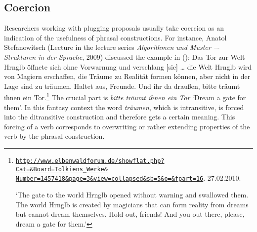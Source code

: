 \subsection{Coercion}
\label{coercion-sec}

Researchers working with plugging proposals usually take coercion as an indication of the usefulness of phrasal
constructions. For instance, Anatol Stefanowitsch (Lecture in the lecture series \emph{Algorithmen und Muster –-
  Strukturen in der Sprache}, 2009) discussed the example in ():
\ea
Das Tor zur Welt Hrnglb öffnete sich ohne Vorwarnung
und verschlang [sie] \ldots{} die Welt Hrnglb wird von Magiern
erschaffen, die Träume zu Realität formen können, aber
nicht in der Lage sind zu träumen. Haltet aus, Freunde.
Und ihr da draußen, bitte träumt ihnen ein Tor.\footnote{
\href{http://www.elbenwaldforum.de/showflat.php?Cat=&Board=Tolkiens_Werke&Number=1457418&page=3&view=collapsed&sb=5&o=&fpart=16}{\nolinkurl{http://www.elbenwaldforum.de/showflat.php?Cat=&Board=Tolkiens_Werke&}}
\href{http://www.elbenwaldforum.de/showflat.php?Cat=&Board=Tolkiens_Werke&Number=1457418&page=3&view=collapsed&sb=5&o=&fpart=16}{\nolinkurl{Number=1457418&page=3&view=collapsed&sb=5&o=&fpart=16}}. 27.02.2010.

`The gate to the world Hrnglb opened without warning and swallowed them. The world Hrnglb is created
by magicians that can form reality from dreams but cannot dream themselves. Hold out, friends! And
you out there, please, dream a gate for them.'
}
\z
The crucial part is \emph{bitte träumt ihnen ein Tor} `Dream a gate for them'. In this fantasy
context the word \emph{träumen}, which is intransitive, is forced into the ditransitive construction
and therefore gets a certain meaning. This forcing of a verb corresponds to overwriting or rather extending properties
of the verb by the phrasal construction.


